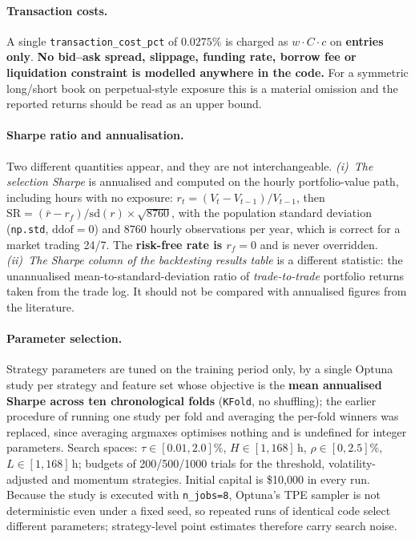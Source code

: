 \paragraph{Transaction costs.}
A single \texttt{transaction\_cost\_pct} of $0.0275\%$ is charged as $w \cdot C \cdot c$
on \textbf{entries only}. \textbf{No bid--ask spread, slippage,
funding rate, borrow fee or liquidation constraint is modelled anywhere in the code.}
For a symmetric long/short book on perpetual-style exposure this is a material
omission and the reported returns should be read as an upper bound.

\paragraph{Sharpe ratio and annualisation.}
Two different quantities appear, and they are not interchangeable.
\emph{(i)~The selection Sharpe} is annualised and computed on the hourly
portfolio-value path, including hours with no exposure:
$r_t = (V_t - V_{t-1})/V_{t-1}$, then
$\mathrm{SR} = \left(\bar{r} - r_f\right)/\mathrm{sd}(r)\times\sqrt{8760}$,
with the population standard deviation (\texttt{np.std}, $\mathrm{ddof}=0$) and
$8760$ hourly observations per year, which is correct for a market trading 24/7.
The \textbf{risk-free rate is $r_f = 0$} and is never overridden.
\emph{(ii)~The \emph{Sharpe} column of the backtesting results table} is a different
statistic: the unannualised mean-to-standard-deviation ratio of \emph{trade-to-trade}
portfolio returns taken from the trade log. It should not be compared with annualised
figures from the literature.

\paragraph{Parameter selection.}
Strategy parameters are tuned on the training period only, by a single Optuna study per
strategy and feature set whose objective is the \textbf{mean annualised Sharpe across ten
chronological folds} (\texttt{KFold}, no shuffling); the earlier procedure of running one
study per fold and averaging the per-fold winners was replaced, since averaging argmaxes
optimises nothing and is undefined for integer parameters. Search spaces:
$\tau\in[0.01,2.0]\%$, $H\in[1,168]\,\mathrm{h}$, $\rho\in[0,2.5]\%$,
$L\in[1,168]\,\mathrm{h}$; budgets of 200/500/1000 trials for the threshold,
volatility-adjusted and momentum strategies. Initial capital is \$10{,}000 in every run.
Because the study is executed with \texttt{n\_jobs=8}, Optuna's TPE sampler is not
deterministic even under a fixed seed, so repeated runs of identical code select
different parameters; strategy-level point estimates therefore carry search noise.

